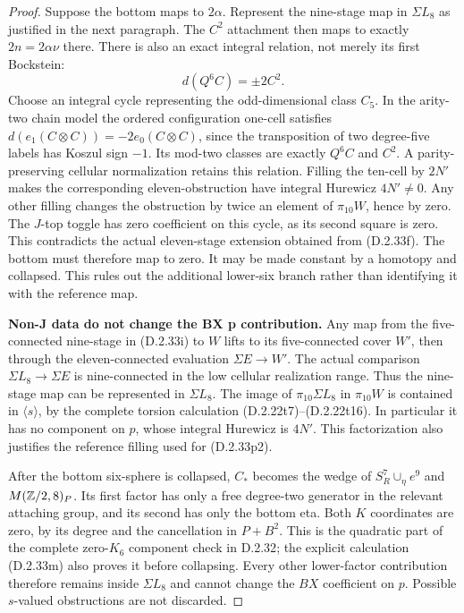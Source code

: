 \begin{proof}
Suppose the bottom maps to $2\alpha$. Represent the
nine-stage map in $\Sigma L_8$ as justified in the next
paragraph. The $C^2$ attachment then maps to exactly
$2n=2\alpha\nu$ there. There is also an exact integral
relation, not merely its first Bockstein:
\[
                         d(Q^6C)=\pm2C^2.
 \tag{D.2.33p2}
\]
Choose an integral cycle representing the odd-dimensional
class $C_5$. In the arity-two chain model the ordered
configuration one-cell satisfies
$d(e_1(C\otimes C))=-2e_0(C\otimes C)$, since the
transposition of two degree-five labels has Koszul sign
$-1$. Its mod-two classes are exactly $Q^6C$ and $C^2$.
A parity-preserving cellular normalization retains this
relation. Filling the ten-cell by $2N'$ makes the
corresponding eleven-obstruction have integral Hurewicz
$4N'\ne0$. Any other filling changes the obstruction by
twice an element of $\pi_{10}W$, hence by zero.
The $J$-top toggle has zero coefficient on this cycle,
as its second square is zero. This contradicts the
actual eleven-stage extension obtained from
\textup{(D.2.33f)}. The bottom must therefore map to zero.
It may be made constant by a homotopy and collapsed.
This rules out the additional lower-six branch rather
than identifying it with the reference map.

\medskip\noindent
\textbf{Non-J data do not change the BX p contribution.}
Any map from the five-connected nine-stage in
\textup{(D.2.33i)} to $W$ lifts to its five-connected cover
$W'$, then through the eleven-connected evaluation
$\Sigma E\to W'$. The actual comparison
$\Sigma L_8\to\Sigma E$ is nine-connected in the low
cellular realization range. Thus the nine-stage map can be
represented in $\Sigma L_8$. The image of
$\pi_{10}\Sigma L_8$ in $\pi_{10}W$ is contained in
$\langle s\rangle$, by the complete torsion calculation
\textup{(D.2.22t7)--(D.2.22t16)}. In particular it has no
component on $p$, whose integral Hurewicz is $4N'$.
This factorization also justifies the reference filling
used for \textup{(D.2.33p2)}.

After the bottom six-sphere is collapsed, $C_*$ becomes
the wedge of $S^7_R\cup_\eta e^9$ and $M(\mathbb Z/2,8)_P$.
Its first factor has only a free degree-two generator in
the relevant attaching group, and its second has only the
bottom eta. Both $K$ coordinates are zero, by its degree
and the cancellation in $P+B^2$. This is the quadratic
part of the complete zero-$K_6$ component check in
\textup{D.2.32}; the explicit calculation
\textup{(D.2.33m)} also proves it before collapsing.
Every other lower-factor contribution therefore remains
inside $\Sigma L_8$ and cannot change the $BX$ coefficient
on $p$. Possible $s$-valued obstructions are not discarded.


\end{proof}
